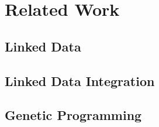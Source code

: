 \chapter{Related Work}
\section{Linked Data}
\section{Linked Data Integration}
\section{Genetic Programming}